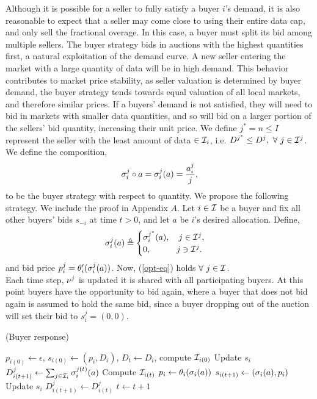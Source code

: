 Although it is possible for a seller to fully satisfy a buyer $i$'s demand, it
is also reasonable to expect that a seller may come close to using their
entire data cap, and only sell the fractional overage. In this case, a buyer
must split its bid among multiple sellers. 
The buyer strategy bids in auctions with the highest quantities first,
a natural exploitation of the demand curve. A new seller entering the market
with a large quantity of data will be in high demand. This behavior contributes to market price
stability, as seller valuation is determined by buyer demand, the
buyer strategy tends towards equal valuation of all local markets, and therefore
similar prices. If a buyers' demand is not satisfied, they will need to bid in
markets with smaller data quantities, and so will bid on a larger portion of
the sellers' bid quantity, increasing their unit price. 
We define $j^* = n \le I$ represent the seller with the least amount of data
$\in\mathcal{I}_i$, i.e. $D^{j^*} \le D^j, \ \forall\ j \in\mathcal{I}^j$.
We define the composition,
$$
     \sigma_i^j \circ a = \sigma_i^j(a) = \frac{a_i^j}{j},
$$
to be the buyer strategy with respect to quantity.
We propose the following strategy. We include the proof in Appendix $A$.
{
\label{buyerstrategy}
Let $i\in\mathcal{I}$ be a buyer and fix all other buyers' bids $s_{-i}$ at time
$t>0$, and let $a$ be $i$'s desired allocation. 
Define,
\begin{equation}\label{opt-eq}
    \sigma_i^j(a) \triangleq \begin{cases} \sigma_i^{j^*}(a), \quad j\in\mathcal{I}^j,\\
            0, \quad\qquad j\ni\mathcal{I}^j.\end{cases}
\end{equation}
and bid price $p_i^j = \theta_i'(\sigma_i^j(a))$.
Now, (\ref{opt-eq}) holds $\forall \ j\in\mathcal{I}$.
}\\
Each time step, $\nu^j$ is updated it is shared with all
participating buyers. At this point buyers have the opportunity to bid again,
where a buyer that does not bid again is assumed to hold the same bid, since a
buyer dropping out of the auction will set their bid to $s_i^j=(0,0)$.

\begin{center}
\begin{algorithm}[H]
\caption{(Buyer response)}
\begin{algorithmic}[1]
\State $p_{i(0)} \gets \epsilon$, $s_{i(0)} \gets (p_i, D_i)$, $D_t \gets D_i$, compute
$\mathcal{I}_{i(0)}$
\State Update $s_i$ 
\State $D_{i(t+1)}^j \gets \sum_{j\in\mathcal{I}_i}\sigma_i^{j(t)}(a)$
    \State Compute $\mathcal{I}_{i(t)}$
    \State $p_i \gets \theta_i(\sigma_i(a))$
\EndIf
\State $s_{i(t+1)} \gets (\sigma_i(a), p_i)$
\State Update $s_i$
\State $D_{i(t+1)}^j \gets D_{i(t)}^j$
\State $t \gets t+1$
\EndWhile
\end{algorithmic}
\end{algorithm}
\end{center}

